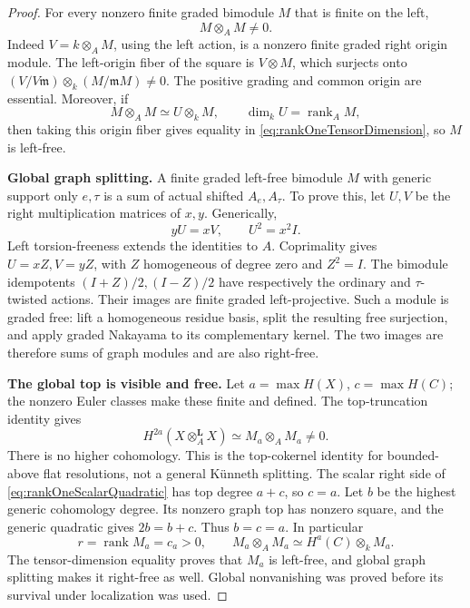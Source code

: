 \begin{proof}
For every nonzero finite graded bimodule \(M\) that
is finite on the left,
\begin{equation}\label{eq:rankOneModuleSquareNonzero}
                         M\otimes_AM\ne0.
\end{equation}
Indeed \(V=k\otimes_AM\), using the left action,
is a nonzero finite graded right origin module.
The left-origin fiber of the square is \(V\otimes M\),
which surjects onto
\((V/V\mathfrak m)\otimes_k(M/\mathfrak mM)\ne0\).
The positive grading and common origin are essential.
Moreover, if
\[
 M\otimes_AM\simeq U\otimes_kM,\qquad
 \dim_kU=\operatorname{rank}_AM,
\]
then taking this origin fiber gives equality in
\eqref{eq:rankOneTensorDimension}, so \(M\) is left-free.

\par\smallskip\noindent\textbf{Global graph splitting.}\quad
A finite graded left-free bimodule \(M\) with generic
support only \(e,\tau\) is a sum of actual shifted
\(A_e,A_\tau\). To prove this, let \(U,V\) be the
right multiplication matrices of \(x,y\). Generically,
\[
 yU=xV,\qquad U^2=x^2I.
\]
Left torsion-freeness extends the identities to \(A\).
Coprimality gives \(U=xZ,V=yZ\), with \(Z\) homogeneous
of degree zero and \(Z^2=I\).
The bimodule idempotents \((I+Z)/2,(I-Z)/2\) have
respectively the ordinary and \(\tau\)-twisted actions.
Their images are finite graded left-projective.
Such a module is graded free: lift a homogeneous
residue basis, split the resulting free surjection,
and apply graded Nakayama to its complementary kernel.
The two images are therefore sums of graph modules
and are also right-free.

\par\smallskip\noindent\textbf{The global top is visible and free.}\quad
Let \(a=\max H(X)\), \(c=\max H(C)\); the nonzero
Euler classes make these finite and defined.
The top-truncation identity gives
\[
 H^{2a}(X\otimes_A^{\mathbf L}X)
              \simeq M_a\otimes_AM_a\ne0.
\]
There is no higher cohomology. This is the
top-cokernel identity for bounded-above flat
resolutions, not a general K\"unneth splitting.
The scalar right side of
\eqref{eq:rankOneScalarQuadratic} has top degree
\(a+c\), so \(c=a\).
Let \(b\) be the highest generic cohomology degree.
Its nonzero graph top has nonzero square, and the
generic quadratic gives \(2b=b+c\).
Thus \(b=c=a\). In particular
\[
 r=\operatorname{rank}M_a=c_a>0,
 \qquad
 M_a\otimes_AM_a\simeq H^a(C)\otimes_kM_a.
\]
The tensor-dimension equality proves that \(M_a\)
is left-free, and global graph splitting makes it
right-free as well.
Global nonvanishing was proved before its survival
under localization was used.


\end{proof}
